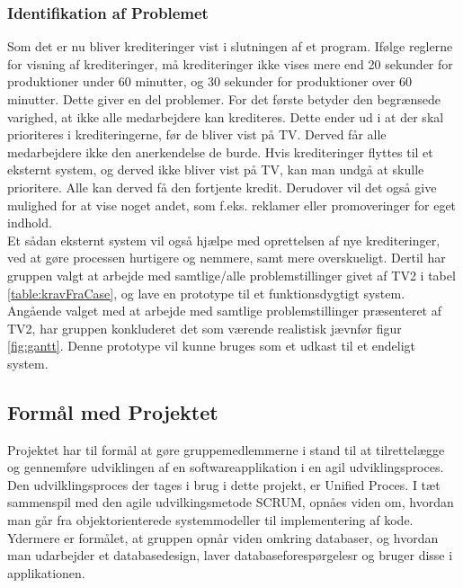 \subsubsection{Identifikation af Problemet}
Som det er nu bliver krediteringer vist i slutningen af et program. Ifølge reglerne for visning af krediteringer, må krediteringer ikke vises mere end 20 sekunder for produktioner under 60 minutter, og 30 sekunder for produktioner over 60 minutter. Dette giver en del problemer. For det første betyder den begrænsede varighed, at ikke alle medarbejdere kan krediteres. Dette ender ud i at der skal prioriteres i krediteringerne, før de bliver vist på TV. Derved får alle medarbejdere ikke den anerkendelse de burde.
Hvis krediteringer flyttes til et eksternt system, og derved ikke bliver vist på TV, kan man undgå at skulle prioritere. Alle kan derved få den fortjente kredit. Derudover vil det også give mulighed for at vise noget andet, som f.eks. reklamer eller promoveringer for eget indhold. \cite{DR-Krediteringsregler} \\


Et sådan eksternt system vil også hjælpe med oprettelsen af nye krediteringer, ved at gøre processen hurtigere og nemmere, samt mere overskueligt. Dertil har gruppen valgt at arbejde med samtlige/alle problemstillinger givet af TV2 i tabel \ref{table:kravFraCase}, og lave en prototype til et funktionsdygtigt system. Angående valget med at arbejde med samtlige problemstillinger præsenteret af TV2, har gruppen konkluderet det som værende realistisk jævnfør figur \ref{fig:gantt}. Denne prototype vil kunne bruges som et udkast til et endeligt system.


\subsection{Formål med Projektet}
Projektet har til formål at gøre gruppemedlemmerne i stand til at tilrettelægge og gennemføre udviklingen af en softwareapplikation i en agil udviklingsproces. Den udvilklingsproces der tages i brug i dette projekt, er Unified Proces. I tæt sammenspil med den agile udvilkingsmetode SCRUM, opnåes viden om, hvordan man går fra objektorienterede systemmodeller til implementering af kode. Ydermere er formålet, at gruppen opnår viden omkring databaser, og hvordan man udarbejder et databasedesign, laver databaseforespørgelesr og bruger disse i applikationen.


